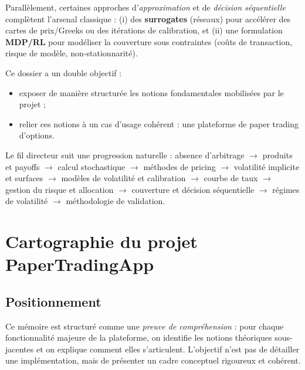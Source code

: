 \documentclass[11pt,a4paper]{article}
\newcommand{\1}{\mathbf{1}}
\begin{document}
Parall\`element, certaines approches d'\emph{approximation} et de \emph{d\'ecision s\'equentielle}
compl\`etent l'arsenal classique : (i) des \textbf{surrogates} (r\'eseaux) pour acc\'el\'erer des cartes de prix/Greeks
ou des it\'erations de calibration, et (ii) une formulation \textbf{MDP/RL} pour mod\'eliser la couverture
sous contraintes (co\^uts de transaction, risque de mod\`ele, non-stationnarit\'e).

Ce dossier a un double objectif :
\begin{itemize}
  \item exposer de mani\`ere structur\'ee les notions fondamentales mobilis\'ees par le projet ;
  \item relier ces notions \`a un cas d'usage coh\'erent : une plateforme de paper trading d'options.
\end{itemize}

\bigskip

Le fil directeur suit une progression naturelle : absence d'arbitrage $\rightarrow$ produits et payoffs
$\rightarrow$ calcul stochastique $\rightarrow$ m\'ethodes de pricing $\rightarrow$ volatilit\'e implicite et surfaces
$\rightarrow$ mod\`eles de volatilité et calibration $\rightarrow$ courbe de taux $\rightarrow$ gestion du risque et allocation
$\rightarrow$ couverture et d\'ecision s\'equentielle $\rightarrow$ r\'egimes de volatilité $\rightarrow$ m\'ethodologie de validation.

\newpage

\section*{Cartographie du projet PaperTradingApp}

\subsection*{Positionnement}
Ce m\'emoire est structur\'e comme une \emph{preuve de compr\'ehension} : pour chaque fonctionnalit\'e majeure de la
plateforme, on identifie les notions th\'eoriques sous-jacentes et on explique comment elles s'articulent.
L'objectif n'est pas de d\'etailler une impl\'ementation, mais de pr\'esenter un cadre conceptuel rigoureux et
coh\'erent.
\end{document}

